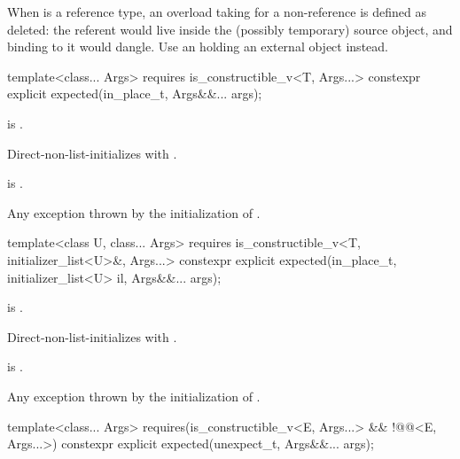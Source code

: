 \begin{itemdescr}
\pnum
\remarks
When  is a reference type, an overload taking  for a non-reference  is defined as deleted: the referent would live inside the (possibly temporary) source  object, and binding  to it would dangle. Use an  holding an external object instead.
\end{itemdescr}

%
\begin{itemdecl}
template<class... Args>
  requires is_constructible_v<T, Args...>
constexpr explicit expected(in_place_t, Args&&... args);
\end{itemdecl}

\begin{itemdescr}
\pnum
\constraints
{} is .

\pnum
\effects
Direct-non-list-initializes  with .

\pnum
\ensures
{} is .

\pnum
\throws
Any exception thrown by the initialization of .
\end{itemdescr}

%
\begin{itemdecl}
template<class U, class... Args>
  requires is_constructible_v<T, initializer_list<U>&, Args...>
constexpr explicit expected(in_place_t, initializer_list<U> il, Args&&... args);
\end{itemdecl}

\begin{itemdescr}
\pnum
\constraints
{} is .

\pnum
\effects
Direct-non-list-initializes  with .

\pnum
\ensures
{} is .

\pnum
\throws
Any exception thrown by the initialization of .
\end{itemdescr}

%
\begin{itemdecl}
template<class... Args>
  requires(is_constructible_v<E, Args...> && !@@<E, Args...>)
constexpr explicit expected(unexpect_t, Args&&... args);
\end{itemdecl}

